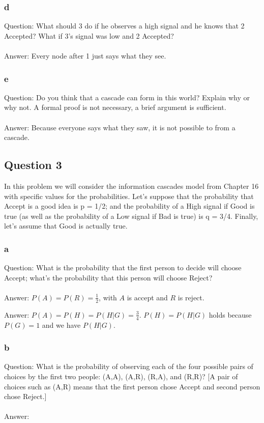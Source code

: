 \documentclass[12pt]{scrartcl}
\begin{document}
\subsubsection*{d}
Question: What should 3 do if he observes a high signal and he knows that 2 Accepted?
What if 3’s signal was low and 2 Accepted?\\\\
Answer: Every node after 1 just says what they see.


\subsubsection*{e}
Question: Do you think that a cascade can form in this world? Explain why or why not. A
formal proof is not necessary, a brief argument is sufficient.\\\\
Answer: Because everyone says what they saw, it is not possible to from a cascade.


\subsection{Question 3}
In this problem we will consider the information cascades model from Chapter 16 with
specific values for the probabilities. Let’s suppose that the probability that Accept is
a good idea is p = 1/2; and the probability of a High signal if Good is true (as well as
the probability of a Low signal if Bad is true) is q = 3/4. Finally, let’s assume that
Good is actually true.

\subsubsection*{a}
Question: What is the probability that the first person to decide will choose Accept; what’s the probability that this person will choose Reject?\\\\
Answer: $P(A) = P(R) =  \frac{1}{2}$, with $A$ is accept and $R$ is reject.

Answer: $P(A) = P(H) = P(H|G) = \frac{3}{4}$. $P(H) = P(H|G)$ holds because $P(G) = 1$ and we have $P(H|G)$.


\subsubsection*{b}
Question: What is the probability of observing each of the four possible pairs of choices by the first two people: (A,A), (A,R), (R,A), and (R,R)? [A pair of choices such as (A,R) means that the first person chose Accept and second person chose Reject.]\\\\
Answer: 
\end{document}
